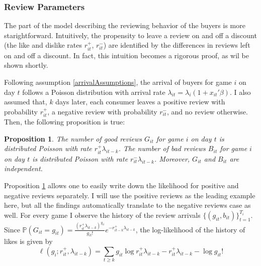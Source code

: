 \documentclass[12pt,pagebackref]{article}
\newtheorem{proposition}{Proposition}[section]
\newcommand{\PP}[1]{\mathbb{P}\left(#1\right)}
\begin{document}
\hypertarget{review-parameters}{%
\subsubsection{Review Parameters}\label{review-parameters}}

The part of the model describing the reviewing behavior of the buyers is
more starightforward. Intuitively, the propensity to leave a review on
and off a discount (the like and dislike rates \(r_{it}^+\),
\(r_{it}^-\)) are identified by the differences in reviews left on and
off a discount. In fact, this intuition becomes a rigorous proof, as wil
be shown shortly.

Following assumption \ref{arrivalAssumptions}, the arrival of buyers for
game \(i\) on day \(t\) follows a Poisson distribution with arrival rate
\(\lambda_{it} = \lambda_i (1 + x_{it}'\beta)\). I also assumed that,
\(k\) days later, each consumer leaves a positive review with
probability \(r_{it}^+\), a negative review with probability
\(r_{it}^-\), and no review otherwise. Then, the following proposition
is true:

\begin{proposition}\label{poissonReviews}
The number of good reviews $G_{it}$ for game $i$ on day $t$ is distributed Poisson with rate $r_{it}^+\lambda_{it-k}$. The number of bad reviews $B_{it}$ for game $i$ on day $t$ is distributed Poisson with rate $r_{it}^-\lambda_{it-k}$. Moreover, $G_{it}$ and $B_{it}$ are independent.
\end{proposition}

Proposition \ref{poissonReviews} allows one to easily write down the
likelihood for positive and negative reviews separately. I will use the
positive reviews as the leading example here, but all the findings
automatically translate to the negative reviews case as well. For every
game I observe the history of the review arrivals
\(\{(g_{it}, b_{it})\}_{t=1}^{T_i}\). Since
\(\PP{G_{it} = g_{it}} = \frac{ (r_{it}^+\lambda_{it-k} )^{g_{it}} }{g_{it}!} e^{ -r_{it-k}^+\lambda_{it-k} }\),
the log-likelihood of the history of likes is given by
\begin{equation}\label{reviewsLikelihood}
\ell(g_i; r_{it}^+, \lambda_{it-k}) = \sum_{t\ge k} g_{it} \log r_{it}^+\lambda_{it-k} - r_{it}^+\lambda_{it-k} - \log g_{it}!
\end{equation}
\end{document}
